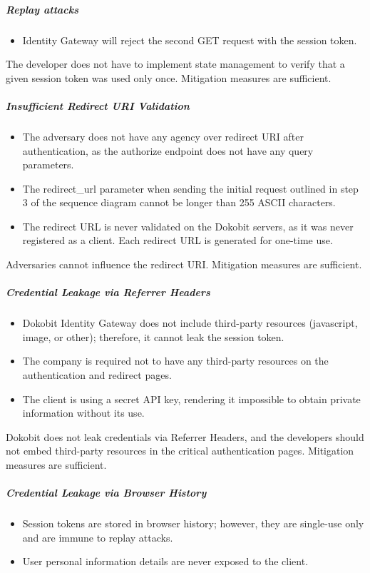 \subparagraph{Replay attacks}

\begin{itemize}
  \item Identity Gateway will reject the second GET request with the session token.
\end{itemize}

The developer does not have to implement state management to verify that a given session token was used only once. Mitigation measures are sufficient.

\subparagraph{Insufficient Redirect URI Validation}

\begin{itemize}
  \item The adversary does not have any agency over redirect URI after authentication, as the {authorize} endpoint does not have any query parameters.
  \item The redirect\_url parameter when sending the initial request outlined in step 3 of the sequence diagram cannot be longer than 255 ASCII characters.
  \item The redirect URL is never validated on the Dokobit servers, as it was never registered as a client. Each redirect URL is generated for one-time use.
\end{itemize}

Adversaries cannot influence the redirect URI. Mitigation measures are sufficient.

\subparagraph{Credential Leakage via Referrer Headers}

\begin{itemize}
  \item Dokobit Identity Gateway does not include third-party resources (javascript, image, or other); therefore, it cannot leak the session token.
  \item The company is required not to have any third-party resources on the authentication and redirect pages.
  \item The client is using a secret API key, rendering it impossible to obtain private information without its use.
\end{itemize}

Dokobit does not leak credentials via Referrer Headers, and the developers should not embed third-party resources in the critical authentication pages. Mitigation measures are sufficient.

\subparagraph{Credential Leakage via Browser History}

\begin{itemize}
  \item Session tokens are stored in browser history; however, they are single-use only and are immune to replay attacks.
  \item User personal information details are never exposed to the client.
\end{itemize}

